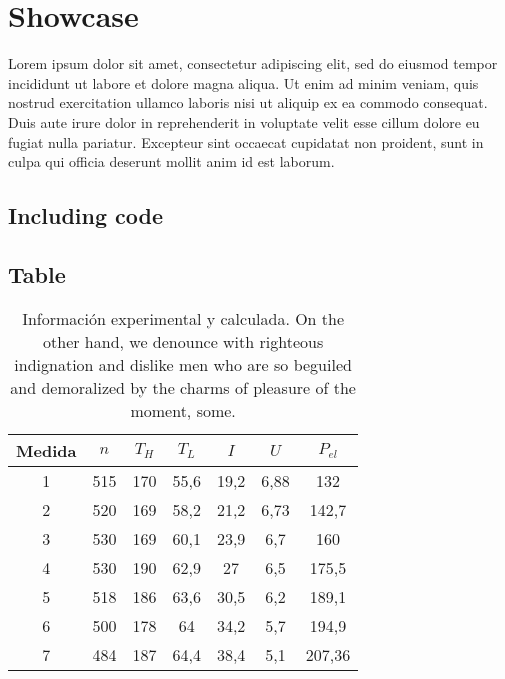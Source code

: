

\chapter{Showcase}\label{cha:showcase}



\drop Lorem ipsum dolor sit amet, consectetur adipiscing elit, sed do eiusmod
tempor incididunt ut labore et dolore magna aliqua. Ut enim ad minim veniam,
quis nostrud exercitation ullamco laboris nisi ut aliquip ex ea commodo
consequat. Duis aute irure dolor in reprehenderit in voluptate velit esse
cillum dolore eu fugiat nulla pariatur. Excepteur sint occaecat cupidatat non
proident, sunt in culpa qui officia deserunt mollit anim id est laborum.


\section{Including code}



\section{Table}

\begin{table}[ht]
  \centering
  \renewcommand{\arraystretch}{1.25}
  \setlength{\tabcolsep}{1.5\tabcolsep}
  \caption{Información experimental y calculada. On the other hand, we denounce
    with righteous indignation and dislike men who are so beguiled and
    demoralized by the charms of pleasure of the moment, some.}\label{tab:info}
  \begin{tabular}{*7c} \toprule
    Medida & $n$ & $T_H$ & $T_L$ & $I$ & $U$ & $P_{el}$ \\
    \midrule
    1  & 515 & 170 & 55,6 & 19,2  & 6,88 & 132    \\
    2  & 520 & 169 & 58,2 & 21,2  & 6,73 & 142,7  \\
    3  & 530 & 169 & 60,1 & 23,9  & 6,7  & 160    \\
    4  & 530 & 190 & 62,9 & 27    & 6,5  & 175,5  \\
    5  & 518 & 186 & 63,6 & 30,5  & 6,2  & 189,1  \\
    6  & 500 & 178 & 64   & 34,2  & 5,7  & 194,9  \\
    7  & 484 & 187 & 64,4 & 38,4  & 5,1  & 207,36 \\
    \bottomrule
  \end{tabular}
\end{table}
